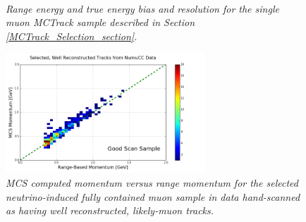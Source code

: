 \begin{figure}
\centering
\mbox{
	\quad
	}
\caption{\textit{Range energy and true energy bias and resolution for the single muon {\sc MCTrack} sample described in Section \ref{MCTrack_Selection_section}.}}
\label{pub_plot_2}
\end{figure}


\begin{figure}
\centering
	\includegraphics[width=75mm]{Figures/MCS_range_momentum_DataRecoTracks_goodhandscan.png}
\caption{\textit{MCS computed momentum versus range momentum for the selected neutrino-induced fully contained muon sample in data hand-scanned as having well reconstructed, likely-muon tracks.}}
\label{pub_plot_3}
\end{figure}


